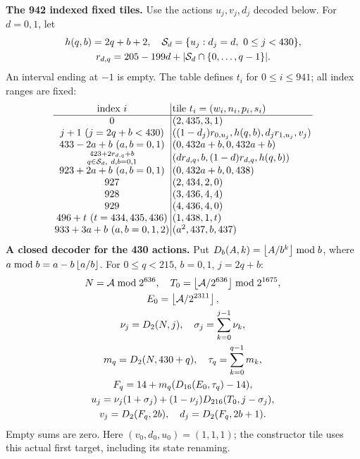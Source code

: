\textbf{The 942 indexed fixed tiles.}
Use the actions $u_j,v_j,d_j$ decoded below. For $d=0,1$, let
\[
\begin{gathered}
h(q,b)=2q+b+2,\quad
\mathcal S_d=\{u_j:d_j=d,\ 0\le j<430\},\\
r_{d,q}=205-199d+|\mathcal S_d\cap\{0,\ldots,q-1\}|.
\end{gathered}
\]
An interval ending at $-1$ is empty. The table defines $t_i$ for
$0\le i\le941$; all index ranges are fixed:
\[
\setlength{\arraycolsep}{1.4pt}\begin{array}{c|l}
\text{index }i&\text{tile }t_i=(w_i,n_i,p_i,s_i)\\\hline
0&(2,435,3,1)\\
j+1\ (j=2q+b<430)&((1-d_j)r_{0,u_j},h(q,b),d_jr_{1,u_j},v_j)\\
433-2a+b\ (a,b=0,1)&(0,432a+b,0,432a+b)\\
\substack{423+2r_{d,q}+b\\q\in\mathcal S_d,\ d,b=0,1}&(dr_{d,q},b,(1-d)r_{d,q},h(q,b))\\
923+2a+b\ (a,b=0,1)&(0,432a+b,0,438)\\
927&(2,434,2,0)\\
928&(3,436,4,4)\\
929&(4,436,4,0)\\
496+t\ (t=434,435,436)&(1,438,1,t)\\
933+3a+b\ (a,b=0,1,2)&(a^2,437,b,437)
\end{array}
\]
\textbf{A closed decoder for the 430 actions.}
Put $D_b(A,k)=\left\lfloor A/b^k\right\rfloor\bmod b$, where
$a\bmod b=a-b\left\lfloor a/b\right\rfloor$. For $0\le q<215$, $b=0,1$, $j=2q+b$:
\[
\begin{gathered}
N=\mathcal A\bmod2^{636},\quad
T_0=\left\lfloor\mathcal A/2^{636}\right\rfloor\bmod2^{1675},\\
E_0=\left\lfloor\mathcal A/2^{2311}\right\rfloor,\\
\nu_j=D_2(N,j),\quad \sigma_j=\sum_{k=0}^{j-1}\nu_k,\\
m_q=D_2(N,430+q),\quad \tau_q=\sum_{k=0}^{q-1}m_k,\\
F_q=14+m_q(D_{16}(E_0,\tau_q)-14),\\
u_j=\nu_j(1+\sigma_j)+(1-\nu_j)D_{216}(T_0,j-\sigma_j),\\
v_j=D_2(F_q,2b),\quad d_j=D_2(F_q,2b+1).
\end{gathered}
\]
Empty sums are zero. Here $(v_0,d_0,u_0)=(1,1,1)$; the constructor tile
uses this actual first target, including its state renaming.

